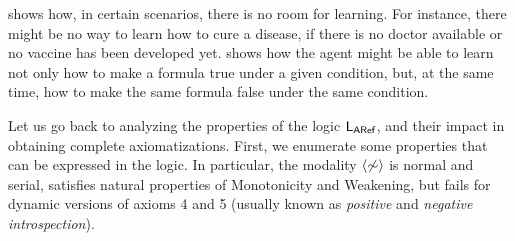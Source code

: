  shows how, in certain scenarios, there is
no room for learning. For instance, there might be no way to learn how
to cure a disease, if there is no doctor
available or no vaccine has been developed yet.  shows how the agent might be able
to learn not only how to make a formula true under a given condition,
but, at the same time, how to make the same formula false under the same condition.

\medskip

Let us go back to analyzing the properties of the logic $\mathsf{L_{ARef}}$, and their impact in obtaining complete axiomatizations. First, we enumerate some properties that can be expressed in the logic. In particular, the modality $\langle \not\sim \rangle$ is normal and serial, satisfies natural properties 
of Monotonicity and Weakening, but fails for dynamic versions of axioms 4 and 5 (usually known as \emph{positive} and \emph{negative introspection}). 

\medskip 

